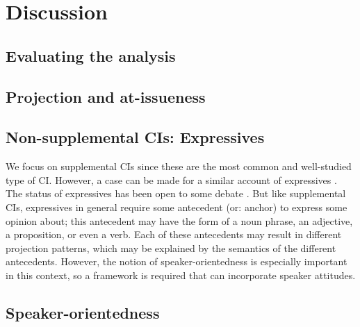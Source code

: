 \section{Discussion}

\subsection{Evaluating the analysis}

\subsection{Projection and at-issueness}

\citet{simons2010projects}

\subsection{Non-supplemental CIs: Expressives}

We focus on supplemental CIs since these are the most common and
well-studied type of CI.  However, a case can be made for a similar account
of expressives \citep[including expressive attributive adjectives, epithets,
honorifics, and tense-variations such as the German `Konjunktiv I';
cf.][]{potts2005logic}. The status of expressives has been open to some
debate \citep[...]{potts2004japanese,geurts2007fucking}.  But like
supplemental CIs, expressives in general require some antecedent (or:
anchor) to express some opinion about; this antecedent may have the form of
a noun phrase, an adjective, a proposition, or even a verb.
Each of these antecedents may result in different projection patterns, which
may be explained by the semantics of the different antecedents. However,
the notion of speaker-orientedness is especially important in this context,
so a framework is required that can incorporate speaker attitudes.

\subsection{Speaker-orientedness}

